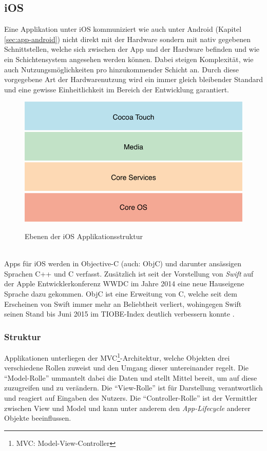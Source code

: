 \subsection{iOS}
	Eine Applikation unter iOS kommuniziert wie auch unter Android (Kapitel
	\ref{sec:app-android}) nicht direkt mit  der Hardware sondern mit nativ
	gegebenen Schnittstellen, welche sich zwischen der App und der Hardware
	befinden und wie ein Schichtensystem angesehen werden können. Dabei steigen
	Komplexität, wie auch Nutzungsmöglichkeiten pro hinzukommender Schicht an.
	Durch diese vorgegebene Art der Hardwarenutzung wird ein immer gleich
	bleibender Standard und eine gewisse Einheitlichkeit im Bereich der Entwicklung
	garantiert.
	\begin{figure}[h]
		\centering
		\includegraphics[width=0.5\linewidth]{ios/media/ios-layers.png}
		\caption{Ebenen der iOS Applikationsstruktur}
		\cite{AboutiOSTech2015}
		\label{fig:marcetshare}
	\end{figure}
	\\
	Apps für iOS werden in Objective-C (auch: ObjC) und darunter ansässigen
	Sprachen C++ und C verfasst. Zusätzlich ist seit der Vorstellung von
	\textsl{Swift} auf der Apple Entwicklerkonferenz WWDC im Jahre 2014 eine
	neue Hauseigene Sprache dazu gekommen. ObjC ist eine Erweitung von C, welche
	seit dem Erscheinen von Swift immer mehr an Beliebtheit verliert, wohingegen
	Swift seinen Stand bis Juni 2015 im TIOBE-Index deutlich verbessern
	konnte \cite{TIOBE062015}.
	\subsubsection{Struktur}
		Applikationen unterliegen der MVC\footnote{MVC:
		Model-View-Controller}-Architektur, welche Objekten drei verschiedene Rollen
		zuweist und den Umgang dieser untereinander regelt. Die "`Model-Rolle"'
		ummantelt dabei die Daten und stellt Mittel bereit, um auf diese zuzugreifen
		und zu verändern. Die "`View-Rolle"' ist für Darstellung verantwortlich und
		reagiert auf Eingaben des Nutzers. Die "`Controller-Rolle"' ist der
		Vermittler zwischen View und Model und kann unter anderem den
		\textsl{App-Lifecycle} anderer Objekte beeinflussen.
